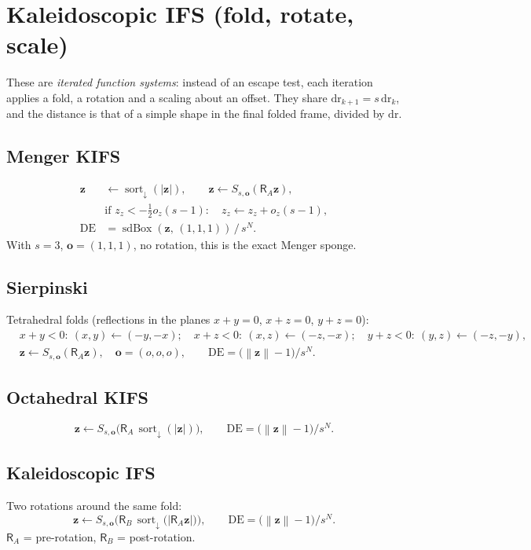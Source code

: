 \documentclass[10pt,a4paper]{article}
\newcommand{\vv}[1]{\mathbf{#1}}
\newcommand{\abs}[1]{\left|#1\right|}
\newcommand{\norm}[1]{\left\lVert#1\right\rVert}
\newcommand{\sdbox}{\operatorname{sdBox}}
\newcommand{\sortd}{\operatorname{sort}_{\downarrow}}
\newcommand{\Rot}{\mathsf{R}}
\newcommand{\DE}{\mathrm{DE}}
\begin{document}
\section{Kaleidoscopic IFS (fold, rotate, scale)}
These are \emph{iterated function systems}: instead of an escape test, each iteration applies a fold, a rotation and a scaling about an offset. They share
$\mathrm{dr}_{k+1}=s\,\mathrm{dr}_k$, and the distance is that of a simple shape in the final folded frame, divided by $\mathrm{dr}$.

\subsection{Menger KIFS}
\begin{align}
\vv z&\leftarrow\sortd(\abs{\vv z}),\qquad\vv z\leftarrow S_{s,\vv o}(\Rot_A\vv z),\\
&\text{if }z_z<-\tfrac12 o_z(s-1):\quad z_z\leftarrow z_z+o_z(s-1),\\
\DE&=\sdbox(\vv z,\,(1,1,1))\,/\,s^{N}.
\end{align}
With $s=3$, $\vv o=(1,1,1)$, no rotation, this is the exact Menger sponge.


\subsection{Sierpinski}
Tetrahedral folds (reflections in the planes $x+y=0$, $x+z=0$, $y+z=0$):
\begin{align}
&x+y<0:\ (x,y)\leftarrow(-y,-x);\quad x+z<0:\ (x,z)\leftarrow(-z,-x);\quad y+z<0:\ (y,z)\leftarrow(-z,-y),\\
&\vv z\leftarrow S_{s,\vv o}(\Rot_A\vv z),\quad\vv o=(o,o,o),\qquad\DE=\big(\norm{\vv z}-1\big)/s^{N}.
\end{align}


\subsection{Octahedral KIFS}
\begin{equation}
\vv z\leftarrow S_{s,\vv o}\big(\Rot_A\,\sortd(\abs{\vv z})\big),\qquad\DE=\big(\norm{\vv z}-1\big)/s^{N}.
\end{equation}


\subsection{Kaleidoscopic IFS}
Two rotations around the same fold:
\begin{equation}
\vv z\leftarrow S_{s,\vv o}\Big(\Rot_B\,\sortd\big(\abs{\Rot_A\vv z}\big)\Big),\qquad\DE=\big(\norm{\vv z}-1\big)/s^{N}.
\end{equation}
$\Rot_A$ = pre-rotation, $\Rot_B$ = post-rotation.

\end{document}
